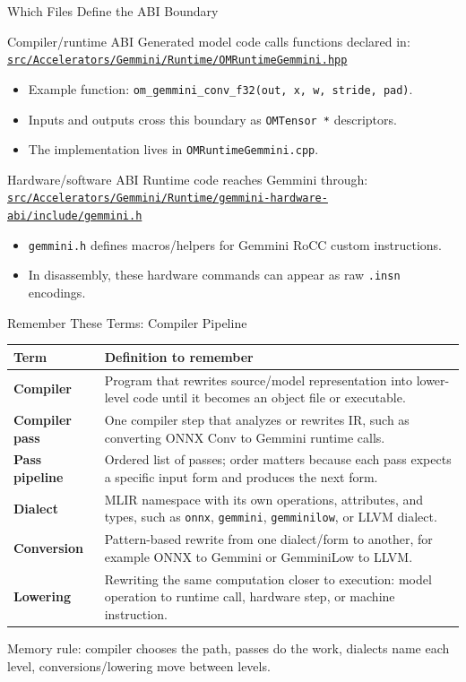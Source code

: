 \documentclass[aspectratio=169,10pt]{beamer}
\newcommand{\code}[1]{\texttt{\footnotesize #1}}
\newcommand{\repoRoot}{/home/lahcen/toolchains/onnx-mlir-xcompile/onnx-mlir}
\newcommand{\pathcode}[1]{\href{run:\repoRoot/#1}{\texttt{\scriptsize #1}}}
\newcommand{\edgeword}[1]{\textcolor{red!75!black}{\textbf{#1}}}
\begin{document}
\begin{frame}{Which Files Define the ABI Boundary}
  \begin{block}{Compiler/runtime ABI}
    Generated model code calls functions declared in:
    \pathcode{src/Accelerators/Gemmini/Runtime/OMRuntimeGemmini.hpp}
  \end{block}
  \begin{itemize}
    \item Example function: \code{om\_gemmini\_conv\_f32(out, x, w, stride, pad)}.
    \item Inputs and outputs cross this boundary as \code{OMTensor *} descriptors.
    \item The implementation lives in \code{OMRuntimeGemmini.cpp}.
  \end{itemize}
  \begin{block}{Hardware/software ABI}
    Runtime code reaches Gemmini through:
    \pathcode{src/Accelerators/Gemmini/Runtime/gemmini-hardware-abi/include/gemmini.h}
  \end{block}
  \begin{itemize}
    \item \code{gemmini.h} defines macros/helpers for Gemmini RoCC custom instructions.
    \item In disassembly, these hardware commands can appear as raw \code{.insn} encodings.
  \end{itemize}
\end{frame}

\begin{frame}{Remember These Terms: Compiler Pipeline}
  \scriptsize
  \begin{tabularx}{\textwidth}{@{}lX@{}}
    \toprule
    Term & Definition to remember \\
    \midrule
    \edgeword{Compiler} &
      Program that rewrites source/model representation into lower-level code until it becomes an object file or executable. \\
    \edgeword{Compiler pass} &
      One compiler step that analyzes or rewrites IR, such as converting ONNX Conv to Gemmini runtime calls. \\
    \edgeword{Pass pipeline} &
      Ordered list of passes; order matters because each pass expects a specific input form and produces the next form. \\
    \edgeword{Dialect} &
      MLIR namespace with its own operations, attributes, and types, such as \code{onnx}, \code{gemmini}, \code{gemminilow}, or LLVM dialect. \\
    \edgeword{Conversion} &
      Pattern-based rewrite from one dialect/form to another, for example ONNX to Gemmini or GemminiLow to LLVM. \\
    \edgeword{Lowering} &
      Rewriting the same computation closer to execution: model operation to runtime call, hardware step, or machine instruction. \\
    \bottomrule
  \end{tabularx}
  \vspace{0.35em}
  {\tiny\color{codegray}
  Memory rule: compiler chooses the path, passes do the work, dialects name each level, conversions/lowering move between levels.}
\end{frame}
\end{document}
